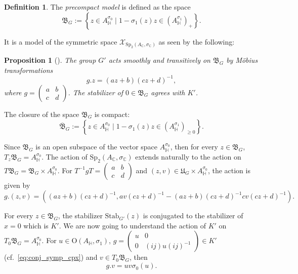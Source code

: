 \documentclass[oneside,11pt]{amsart}
\newtheorem{prop}[thm]{Proposition}
\theoremstyle{definition}
\newtheorem{defn}[thm]{Definition}
\theoremstyle{remark}
\numberwithin{thm}{section}
\numberwithin{equation}{section}
\begin{document}
\begin{defn}
    The \emph{precompact model} is defined as the space 
    $$\mathfrak{B}_G:=\left\{z\in A^{\sigma_0}_\mathbb{H}\mid 1-\sigma_1(z)z\in (A^{\sigma_1}_\mathbb{H})_+\right\}.$$
\end{defn}

It is a model of the symmetric space $\mathcal X_{\mathrm{Sp}_2(A_\mathbb{C},\sigma_\mathbb{C})}$ as seen by the following:

\begin{prop}[{\cite[Proposition~6.16]{ABRRW}}]
    The group $G'$ acts smoothly and transitively on $\mathfrak{B}_G$ by M\"obius transformations 
    $$g.z=(az+b)(cz+d)^{-1},$$ 
    where $g=\begin{pmatrix}
        a & b \\
        c & d
    \end{pmatrix}$. The stabilizer of $0\in\mathfrak{B}_G$ agrees with $K'$.
\end{prop}

The closure of the space $\mathfrak{B}_G$ is compact:
    $$\overline{\mathfrak{B}}_G:=\left\{z\in A^{\sigma_0}_\mathbb{H}\mid 1-\sigma_1(z)z\in (A^{\sigma_1}_\mathbb{H})_{\geq 0}\right\}.$$

Since $\mathfrak{B}_G$ is an open subspace of the vector space $A_\mathbb{H}^{\sigma_0}$, then for every $z\in \mathfrak{B}_G$, $T_z\mathfrak{B}_G = A_\mathbb{H}^{\sigma_0}$.  The action of $\mathrm{Sp}_2(A_\mathbb C,\sigma_\mathbb C)$ extends naturally to the action on $T\mathfrak{B}_G=\mathfrak{B}_G\times A^{\sigma_0}_\mathbb H$. For $T^{-1}gT=\begin{pmatrix}
        a & b \\
        c & d
    \end{pmatrix}$
and $(z,v)\in \mathfrak{U}_G\times A^{\sigma_0}_\mathbb H$,  the action is given by
$$g.(z,v)=\left((az+b)(cz+d)^{-1}, av(cz+d)^{-1}-(az+b)(cz+d)^{-1}cv(cz+d)^{-1}\right).$$

For every $z\in\mathfrak B_G$, the stabilizer $\mathrm{Stab}_{G'}(z)$ is conjugated to the stabilizer of $x=0$ which is $K'$. We are now going to understand the action of $K'$ on $T_0\mathfrak B_G= A_\mathbb{H}^{\sigma_0}$. For $u\in \mathrm O(A_\mathbb H,\sigma_1)$,
    $g=\begin{pmatrix}
        u & 0 \\
        0 & (ij) u (ij)^{-1}
    \end{pmatrix}\in K'$ 
(cf.~\eqref{eq:conj_symp_cpx}) and $v\in T_0\mathfrak B_G$, then 
$$g.v=uv\sigma_0(u).$$
\end{document}
